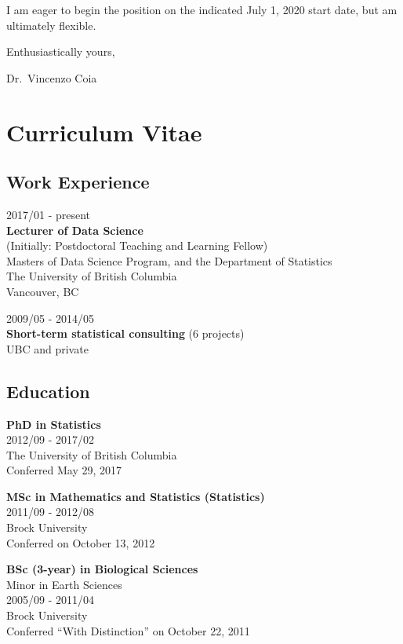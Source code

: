 \documentclass[]{book}
\begin{document}
I am eager to begin the position on the indicated July 1, 2020 start date, but am ultimately flexible.

Enthusiastically yours,

Dr.~Vincenzo Coia

\hypertarget{curriculum-vitae}{%
\chapter{Curriculum Vitae}\label{curriculum-vitae}}

\hypertarget{work-experience}{%
\section{Work Experience}\label{work-experience}}

2017/01 - present\\
\textbf{Lecturer of Data Science}\\
(Initially: Postdoctoral Teaching and Learning Fellow)\\
Masters of Data Science Program, and the Department of Statistics\\
The University of British Columbia\\
Vancouver, BC

2009/05 - 2014/05\\
\textbf{Short-term statistical consulting} (6 projects)\\
UBC and private

\hypertarget{education}{%
\section{Education}\label{education}}

\textbf{PhD in Statistics}\\
2012/09 - 2017/02\\
The University of British Columbia\\
Conferred May 29, 2017

\textbf{MSc in Mathematics and Statistics (Statistics)}\\
2011/09 - 2012/08\\
Brock University\\
Conferred on October 13, 2012

\textbf{BSc (3-year) in Biological Sciences}\\
Minor in Earth Sciences\\
2005/09 - 2011/04\\
Brock University\\
Conferred ``With Distinction'' on October 22, 2011
\end{document}

